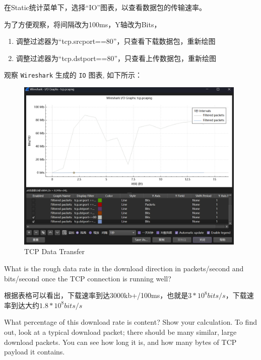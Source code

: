 \documentclass{article}
\begin{document}
	在Static统计菜单下，选择“IO”图表，以查看数据包的传输速率。
	
	为了方便观察，将间隔改为100ms，Y轴改为Bits，
	
	\begin{enumerate}[noitemsep, label={{\arabic*})}]
		\item 调整过滤器为“tcp.srcport==80”，只查看下载数据包，重新绘图
		\item 调整过滤器为“tcp.dstport==80”，只查看上传数据包，重新绘图
	\end{enumerate}\textbf{}
	
	观察 \texttt{Wireshark} 生成的 \texttt{IO} 图表, 如下所示：
	
	\begin{figure}[H]
		\centering
		\includegraphics[width=11cm]{images/22.TCP Data Transfer.png}
		\caption{TCP Data Transfer}
	\end{figure}
	
	\begin{tcolorbox}[title = {Question-1}, colback = red!25!white, colframe = red!75!black]
		What is the rough data rate in the download direction in packets/second and bits/second once the TCP connection is
		running well?
	\end{tcolorbox}
	
	\begin{tcolorbox}[title = {Answer-1}, colback = blue!25!white, colframe = blue!75!black]
		根据表格可以看出，下载速率到达3000kb+/100ms，也就是$ 3*10^8 bits/s $，下载速率到达大约$ 1.8*10^8 bits/s $
	\end{tcolorbox}
	
	\begin{tcolorbox}[title = {Question-2}, colback = red!25!white, colframe = red!75!black]
		What percentage of this download rate is content? Show your calculation. To find out, look at a typical download packet; there should be many similar, large download packets. You can see how long it is, and how many bytes of TCP payload it contains.
	\end{tcolorbox}
	
\end{document}
